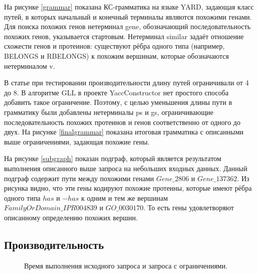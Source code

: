 \documentclass[14pt]{matmex-diploma}
\begin{document}
На рисунке \ref{grammar} показана КС-грамматика на языке YARD, задающая класс путей, в которых начальный и конечный терминалы являются похожими генами. Для поиска похожих генов нетерминал gene, обозначающий последовательность похожих генов, указывается стартовым. Нетерминал similar задаёт отношение схожести генов и протеинов: существуют рёбра одного типа (например, BELONGS и RBELONGS) к похожим вершинам, которые обозначаются нетерминалом v.

В статье \cite{subgraph} при тестировании производительности длину путей ограничивали от 4 до 8. В алгоритме GLL в проекте YaccConstructor нет простого способа добавить такое ограничение. Поэтому, с целью уменьшения длины пути в грамматику были добавлены нетерминалы ps и gs, ограничивающие последовательность похожих протеинов и генов соответственно от одного до двух. На рисунке \ref{finalgrammar} показана итоговая грамматика с описанными выше ограничениями, задающая похожие гены.

На рисунке \ref{subgraph} показан подграф, который является результатом выполнения описанного выше запроса на небольших входных данных. Данный подграф содержит пути между похожими генами $Gene\_2806$ и $Gene\_137362$. Из рисунка видно, что эти гены кодируют похожие протеины, которые имеют рёбра одного типа $has$ и $-has$ к одним и тем же вершинам $FamilyOrDomain\_IPR004839$ и $GO\_0030170$. То есть гены удовлетворяют описанному определению похожих вершин.

\subsection{Производительность}

\begin{figure}
\begin{center}
\end{center}
\caption{Время выполнения исходного запроса и запроса с ограничениями.}
\label{compareGrammar}
\end{figure}
\end{document}
